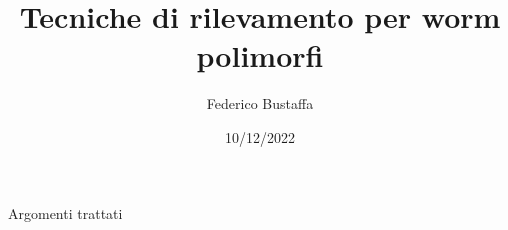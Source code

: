 \documentclass{beamer}
\title{Tecniche di rilevamento per worm polimorfi}
\author{Federico Bustaffa}
\date{10/12/2022}
\begin{document}
\maketitle

\begin{frame}{Argomenti trattati}

\end{frame}
\end{document}

